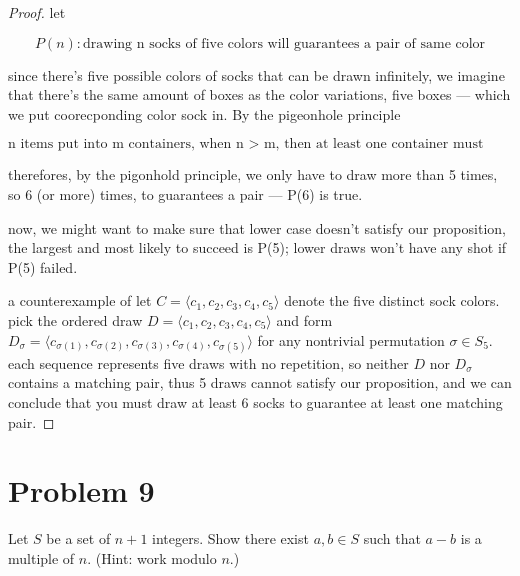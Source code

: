  \begin{proof}

  let

     \[P(n): \text{drawing n socks of five colors will guarantees a pair of
     same color}\]

  since there's five possible colors of socks that can be drawn
  infinitely, we imagine that there's the same amount of boxes as the
  color variations, five boxes --- which we put coorecponding color
  sock in. By the pigeonhole principle

     \[\text{n items put into m containers, when n > m, then at least one
     container must contain more than one item}\]

     therefores, by the pigonhold principle, we only have to draw
     more than 5 times, so 6 (or more) times, to guarantees a pair --- P(6) is true.

     \vspace{1em}
  now, we might want to make sure that lower case doesn't satisfy our
  proposition, the largest and most likely to succeed is P(5); lower draws won't have any shot if P(5) failed. 

     \vspace{1em}
  a counterexample of let $C = \langle c_1, c_2, c_3, c_4, c_5 \rangle$
  denote the five distinct sock colors. pick the ordered draw
  $D = \langle c_1, c_2, c_3, c_4, c_5 \rangle$ and form
  $D_\sigma = \langle c_{\sigma(1)}, c_{\sigma(2)}, c_{\sigma(3)},
  c_{\sigma(4)}, c_{\sigma(5)} \rangle$ for any nontrivial permutation
  $\sigma \in S_5$. each sequence represents five draws with no
  repetition, so neither $D$ nor $D_\sigma$ contains a matching pair,
  thus 5 draws cannot satisfy our proposition, and we can conclude
  that you must draw at least 6 socks to guarantee at least one
  matching pair.
  
 \end{proof}

\vspace{1em}
\hrulefill

\section*{Problem 9}
Let $S$ be a set of $n+1$ integers. Show there exist $a,b \in S$ such that $a-b$ is a multiple of $n$. (Hint: work modulo $n$.)

\medskip
\solution


